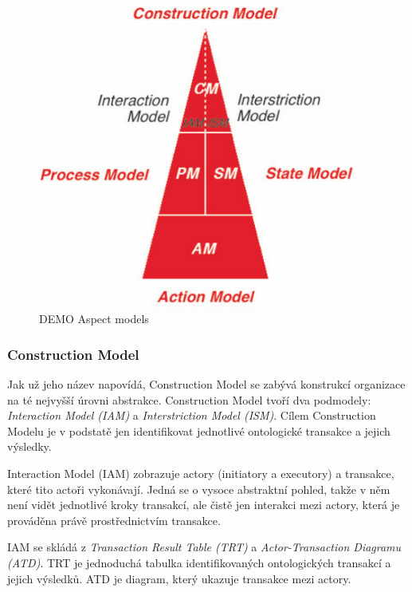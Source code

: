 \begin{center}
\begin{figure}[H]
\centerline{\includegraphics[scale=0.75]{obrazky/aspect-models}}
\caption{DEMO Aspect models \cite{Dietz2006}}
\label{fig:aspect_model}
\end{figure}
\end{center}

\subsubsection{Construction Model}
Jak už jeho název napovídá, Construction Model se zabývá konstrukcí organizace na té nejvyšší úrovni abstrakce. Construction Model tvoří dva podmodely: \textit{Interaction Model (IAM)} a \textit{Interstriction Model (ISM)}. Cílem Construction Modelu je v podstatě jen identifikovat jednotlivé ontologické transakce a jejich výsledky. 


Interaction Model (IAM) zobrazuje actory (initiatory a executory) a transakce, které tito actoři vykonávají. Jedná se o vysoce abstraktní pohled, takže v něm není vidět jednotlivé kroky transakcí, ale čistě jen interakci mezi actory, která je prováděna právě prostřednictvím transakce.

IAM se skládá z \textit{Transaction Result Table (TRT)} a \textit{Actor-Transaction Diagramu (ATD)}. TRT je jednoduchá tabulka identifikovaných ontologických transakcí a jejich výsledků. ATD je diagram, který ukazuje transakce mezi actory.

